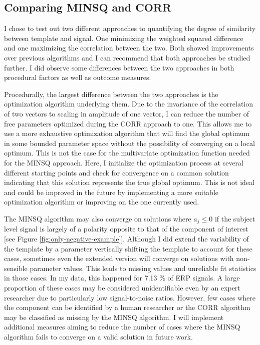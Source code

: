 \documentclass[
  man]{apa7}
\begin{document}
\hypertarget{comparing-minsq-and-corr}{%
\subsection{Comparing MINSQ and CORR}\label{comparing-minsq-and-corr}}

I chose to test out two different approaches to quantifying the degree of similarity between template and signal. One minimizing the weighted squared difference and one maximizing the correlation between the two. Both showed improvements over previous algorithms and I can recommend that both approaches be studied further. I did observe some differences between the two approaches in both procedural factors as well as outcome measures.

Procedurally, the largest difference between the two approaches is the optimization algorithm underlying them. Due to the invariance of the correlation of two vectors to scaling in amplitude of one vector, I can reduce the number of free parameters optimized during the CORR approach to one. This allows me to use a more exhaustive optimization algorithm that will find the global optimum in some bounded parameter space without the possibility of converging on a local optimum. This is not the case for the multivariate optimization function needed for the MINSQ approach. Here, I initialize the optimization process at several different starting points and check for convergence on a common solution indicating that this solution represents the true global optimum. This is not ideal and could be improved in the future by implementing a more suitable optimization algorithm or improving on the one currently used.

The MINSQ algorithm may also converge on solutions where \(a_j \le 0\) if the subject level signal is largely of a polarity opposite to that of the component of interest {[}see Figure \ref{fig:only-negative-example}{]}. Although I did extend the variability of the template by a parameter vertically shifting the template to account for these cases, sometimes even the extended version will converge on solutions with non-sensible parameter values. This leads to missing values and unreliable fit statistics in those cases. In my data, this happened for 7.13 \% of ERP signals. A large proportion of these cases may be considered unidentifiable even by an expert researcher due to particularly low signal-to-noise ratios. However, few cases where the component can be identified by a human researcher or the CORR algorithm may be classified as missing by the MINSQ algorithm. I will implement additional measures aiming to reduce the number of cases where the MINSQ algorithm fails to converge on a valid solution in future work.
\end{document}
